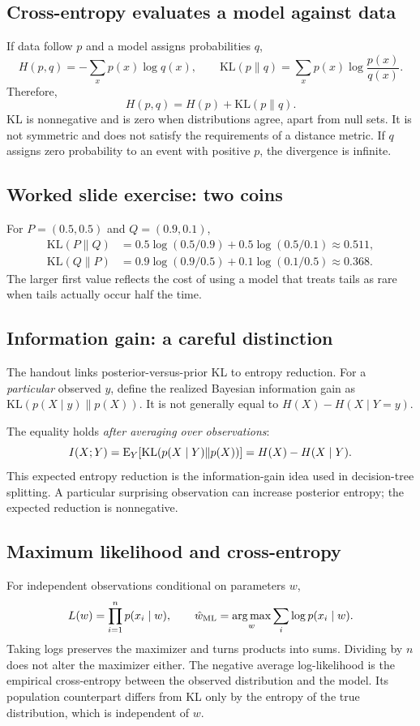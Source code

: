 \documentclass[11pt]{article}
\begin{document}
\subsection{Cross-entropy evaluates a model against data}
If data follow $p$ and a model assigns probabilities $q$,
\[
H(p,q)=-\sum_xp(x)\log q(x),\qquad
\mathrm{KL}(p\|q)=\sum_xp(x)\log\frac{p(x)}{q(x)}.
\]
Therefore,
\[
\boxed{H(p,q)=H(p)+\mathrm{KL}(p\|q)}.
\]
KL is nonnegative and is zero when distributions agree, apart from null sets. It is not symmetric and does not satisfy the requirements of a distance metric. If $q$ assigns zero probability to an event with positive $p$, the divergence is infinite.
\subsection{Worked slide exercise: two coins}
For $P=(0.5,0.5)$ and $Q=(0.9,0.1)$,
\begin{align*}
\mathrm{KL}(P\|Q)&=0.5\log(0.5/0.9)+0.5\log(0.5/0.1)\approx0.511,\\
\mathrm{KL}(Q\|P)&=0.9\log(0.9/0.5)+0.1\log(0.1/0.5)\approx0.368.
\end{align*}
The larger first value reflects the cost of using a model that treats tails as rare when tails actually occur half the time.
\subsection{Information gain: a careful distinction}
The handout links posterior-versus-prior KL to entropy reduction. For a \emph{particular} observed $y$, define the realized Bayesian information gain as $\mathrm{KL}(p(X\mid y)\|p(X))$. It is not generally equal to $H(X)-H(X\mid Y=y)$.

The equality holds \emph{after averaging over observations}:
\[
I(X;Y)=\operatorname{E}_Y[\mathrm{KL}(p(X\mid Y)\|p(X))]
=H(X)-H(X\mid Y).
\]
This expected entropy reduction is the information-gain idea used in decision-tree splitting. A particular surprising observation can increase posterior entropy; the expected reduction is nonnegative.
\subsection{Maximum likelihood and cross-entropy}
For independent observations conditional on parameters $w$,
\[
L(w)=\prod_{i=1}^n p(x_i\mid w),\qquad
\hat w_{\mathrm{ML}}=\operatorname*{arg\,max}_w\sum_i\log p(x_i\mid w).
\]
Taking logs preserves the maximizer and turns products into sums. Dividing by $n$ does not alter the maximizer either. The negative average log-likelihood is the empirical cross-entropy between the observed distribution and the model. Its population counterpart differs from KL only by the entropy of the true distribution, which is independent of $w$.
\end{document}
